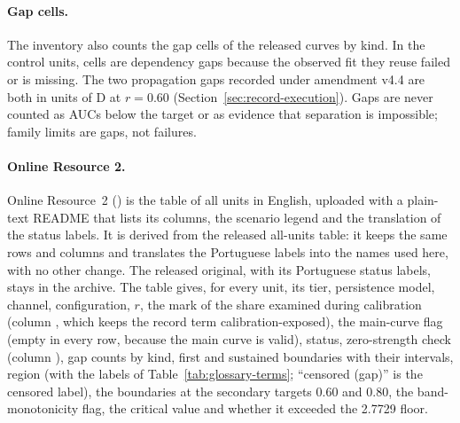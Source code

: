 \paragraph{Gap cells.}
The inventory also counts the gap cells of the released curves by kind. In the control units,  cells are dependency gaps because the observed fit they reuse failed or is missing. The two propagation gaps recorded under amendment v4.4 are both in units of D at $r=0.60$ (Section~\ref{sec:record-execution}). Gaps are never counted as AUCs below the target or as evidence that separation is impossible; family limits are gaps, not failures.

\paragraph{Online Resource 2.}
Online Resource~2 () is the table of all units in English, uploaded with a plain-text README that lists its columns, the scenario legend and the translation of the status labels. It is derived from the released all-units table: it keeps the same rows and columns and translates the Portuguese labels into the names used here, with no other change. The released original, with its Portuguese status labels, stays in the archive. The table gives, for every unit, its tier, persistence model, channel, configuration, $r$, the mark of the share examined during calibration (column , which keeps the record term calibration-exposed), the main-curve flag (empty in every row, because the main curve is valid), status, zero-strength check (column ), gap counts by kind, first and sustained boundaries with their intervals, region (with the labels of Table~\ref{tab:glossary-terms}; ``censored (gap)'' is the censored label), the boundaries at the secondary targets 0.60 and 0.80, the band-monotonicity flag, the critical value and whether it exceeded the 2.7729 floor.



\clearpage
